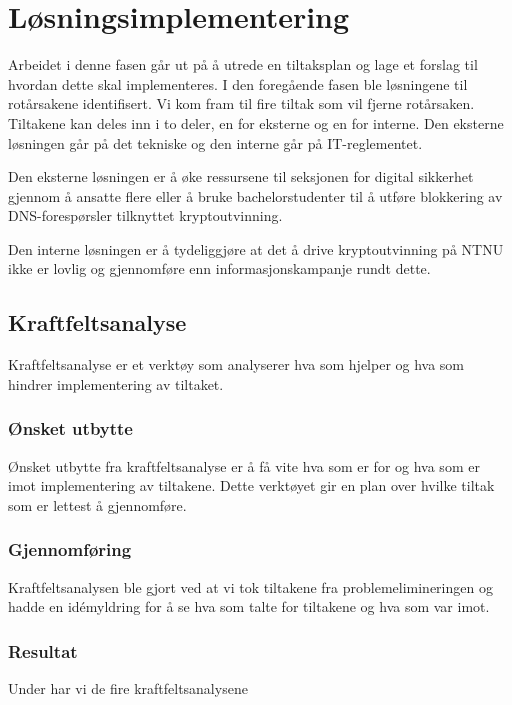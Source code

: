 \chapter{Løsningsimplementering}
Arbeidet i denne fasen går ut på å utrede en tiltaksplan og lage et forslag til hvordan dette skal implementeres. I den foregående fasen ble løsningene til rotårsakene identifisert. Vi kom fram til fire tiltak som vil fjerne rotårsaken. Tiltakene kan deles inn i to deler, en for eksterne og en for interne. Den eksterne løsningen går på det tekniske og den interne går på IT-reglementet. 

Den eksterne løsningen er å øke ressursene til seksjonen for digital sikkerhet gjennom å ansatte flere eller å bruke bachelorstudenter til å utføre blokkering av DNS-forespørsler tilknyttet kryptoutvinning.

Den interne løsningen er å tydeliggjøre at det å drive kryptoutvinning på NTNU ikke er lovlig og gjennomføre enn informasjonskampanje rundt dette.

\section{Kraftfeltsanalyse}
Kraftfeltsanalyse er et verktøy som analyserer hva som hjelper og hva som hindrer implementering av tiltaket.  

\subsection{Ønsket utbytte}
Ønsket utbytte fra kraftfeltsanalyse er å få vite hva som er for og hva som er imot implementering av tiltakene. Dette verktøyet gir en plan over hvilke tiltak som er lettest å gjennomføre. 

\subsection{Gjennomføring}
Kraftfeltsanalysen ble gjort ved at vi tok tiltakene fra problemelimineringen og hadde en idémyldring for å se hva som talte for tiltakene og hva som var imot. 

\subsection{Resultat}
 Under har vi de fire kraftfeltsanalysene
 
